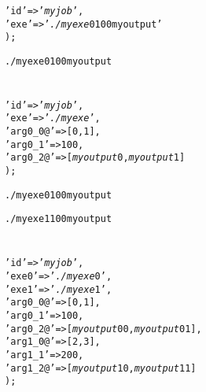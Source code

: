 \documentclass[a4paper,10pt]{report}
\begin{document}
\begin{boxnote}
\begin{alltt}
%myjob = (
    'id' => '\textit{myjob}',
    'exe' => '\textit{./myexe} 0 100 myoutput'
);
\end{alltt}
\end{boxnote}

\begin{boxnote}
\begin{alltt}
./myexe 0 100 myoutput
\end{alltt}
\end{boxnote}

\section{}

\begin{boxnote}
\begin{alltt}
%myjob = (
    'id' => '\textit{myjob}',
    'exe' => '\textit{./myexe}',
    'arg0_0@' => [0,1],
    'arg0_1' => 100,
    'arg0_2@' => [\textit{myoutput}0,\textit{myoutput}1]
);
\end{alltt}
\end{boxnote}

\begin{boxnote}
\begin{alltt}
./myexe 0 100 myoutput
\end{alltt}
\end{boxnote}

\begin{boxnote}
\begin{alltt}
./myexe 1 100 myoutput
\end{alltt}
\end{boxnote}

\section{}

\begin{boxnote}
\begin{alltt}
%myjob = (
    'id' => '\textit{myjob}',
    'exe0' => '\textit{./myexe}0',
    'exe1' => '\textit{./myexe}1',
    'arg0_0@' => [0,1],
    'arg0_1' => 100,
    'arg0_2@' => [\textit{myoutput}00,\textit{myoutput}01],
    'arg1_0@' => [2,3],
    'arg1_1' => 200,
    'arg1_2@' => [\textit{myoutput}10,\textit{myoutput}11]
);
\end{alltt}
\end{boxnote}
\end{document}
